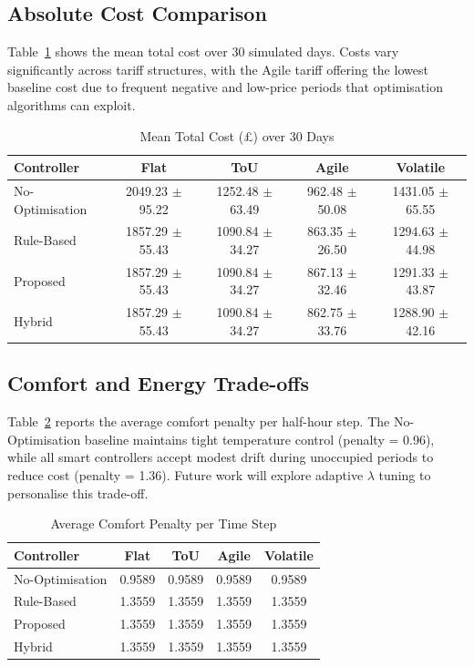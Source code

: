 \documentclass[11pt,a4paper]{article}
\begin{document}
\subsection{Absolute Cost Comparison}

Table~\ref{tab:absolute_cost} shows the mean total cost over 30 simulated days. Costs vary significantly across tariff structures, with the Agile tariff offering the lowest baseline cost due to frequent negative and low-price periods that optimisation algorithms can exploit.

\begin{table}[htbp]
\centering
\caption{Mean Total Cost (£) over 30 Days}
\label{tab:absolute_cost}
\begin{tabular}{@{}lcccc@{}}
\toprule
\textbf{Controller} & \textbf{Flat} & \textbf{ToU} & \textbf{Agile} & \textbf{Volatile} \\
\midrule
No-Optimisation & 2049.23 $\pm$ 95.22 & 1252.48 $\pm$ 63.49 & 962.48 $\pm$ 50.08 & 1431.05 $\pm$ 65.55 \\
Rule-Based & 1857.29 $\pm$ 55.43 & 1090.84 $\pm$ 34.27 & 863.35 $\pm$ 26.50 & 1294.63 $\pm$ 44.98 \\
Proposed & 1857.29 $\pm$ 55.43 & 1090.84 $\pm$ 34.27 & 867.13 $\pm$ 32.46 & 1291.33 $\pm$ 43.87 \\
Hybrid & 1857.29 $\pm$ 55.43 & 1090.84 $\pm$ 34.27 & 862.75 $\pm$ 33.76 & 1288.90 $\pm$ 42.16 \\
\bottomrule
\end{tabular}
\end{table}

\subsection{Comfort and Energy Trade-offs}

Table~\ref{tab:comfort} reports the average comfort penalty per half-hour step. The No-Optimisation baseline maintains tight temperature control (penalty = 0.96), while all smart controllers accept modest drift during unoccupied periods to reduce cost (penalty = 1.36). Future work will explore adaptive $\lambda$ tuning to personalise this trade-off.

\begin{table}[htbp]
\centering
\caption{Average Comfort Penalty per Time Step}
\label{tab:comfort}
\begin{tabular}{@{}lcccc@{}}
\toprule
\textbf{Controller} & \textbf{Flat} & \textbf{ToU} & \textbf{Agile} & \textbf{Volatile} \\
\midrule
No-Optimisation & 0.9589 & 0.9589 & 0.9589 & 0.9589 \\
Rule-Based & 1.3559 & 1.3559 & 1.3559 & 1.3559 \\
Proposed & 1.3559 & 1.3559 & 1.3559 & 1.3559 \\
Hybrid & 1.3559 & 1.3559 & 1.3559 & 1.3559 \\
\bottomrule
\end{tabular}
\end{table}
\end{document}
